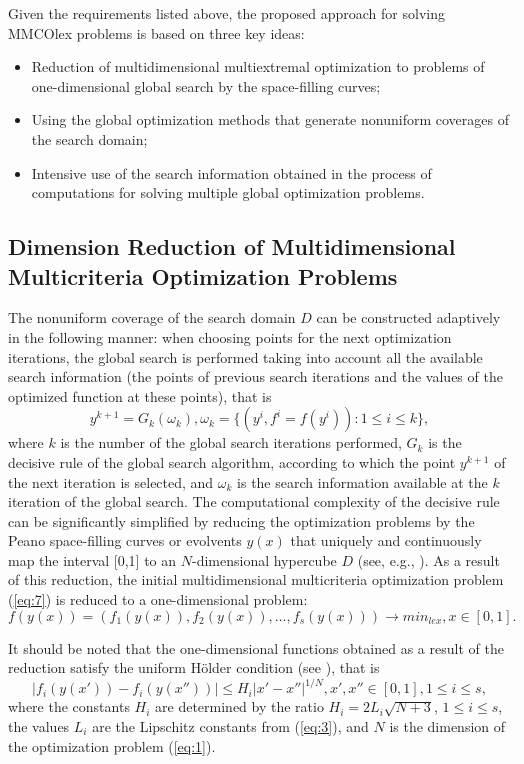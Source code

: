 \documentclass[smallextended]{svjour3}       %
\begin{document}
Given the requirements listed above, the proposed approach for solving MMCOlex problems is based on three key ideas:
\begin{itemize}
	\item Reduction of multidimensional multiextremal optimization to problems of one-dimensional global search by the space-filling curves;
	\item Using the global optimization methods that generate nonuniform coverages of the search domain;
	\item Intensive use of the search information obtained in the process of computations for solving multiple global optimization problems.
\end{itemize}

\subsection{Dimension Reduction of Multidimensional Multicriteria Optimization Problems}

The nonuniform coverage of the search domain $D$ can be constructed adaptively in the following manner: when choosing points for the next optimization iterations, the global search is performed taking into account all the available search information (the points of previous search iterations and the values of the optimized function at these points), that is
\begin{equation}\label{eq:11}
y^{k+1}=G_k(\omega_k), \omega_k=\{(y^i,f^i=f(y^i)): 1 \leq i \leq k \},
\end{equation}
where $k$ is the number of the global search iterations performed, $G_k$ is the decisive rule of the global search algorithm, according to which the point $y^{k+1}$ of the next iteration is selected, and $\omega_k$ is the search information available at the $k$ iteration of the global search. The computational complexity of the decisive rule can be significantly simplified by reducing the optimization problems by the Peano space-filling curves or evolvents $y(x)$ that uniquely and continuously map the interval [0,1] to an $N$-dimensional hypercube $D$ (see, e.g., \cite{c17,c18,c23}). As a result of this reduction, the initial multidimensional multicriteria optimization problem (\ref{eq:7}) is reduced to a one-dimensional problem:
\begin{equation}\label{eq:12}
f(y(x)) = (f_1(y(x)), f_2(y(x)), \dots, f_s(y(x))) \to min_{lex},  x \in [0,1].
\end{equation}

It should be noted that the one-dimensional functions obtained as a result of the reduction satisfy the uniform H\"older condition (see \cite{c17,c18}), that is
\begin{equation}\label{eq:13}
|f_i (y(x'))-f_i (y(x''))| \leq H_i |x'-x''|^{1/N}, x',x''\in [0,1], 1 \leq i \leq s,
\end{equation}
where the constants $H_i$ are determined by the ratio $H_i=2L_i\sqrt{N+3}$,  $1 \leq i \leq s$, the values $L_i$ are the Lipschitz constants from (\ref{eq:3}), and $N$ is the dimension of the optimization problem (\ref{eq:1}).
\end{document}
